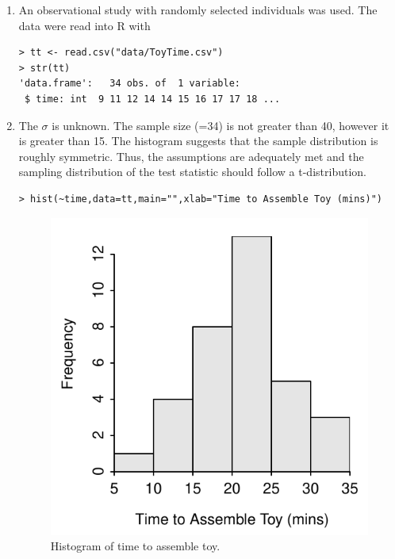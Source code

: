 \documentclass[10pt,openany]{book}\usepackage[]{graphicx}\usepackage[]{color}
\makeatletter
\newenvironment{kframe}{%
 \def\at@end@of@kframe{}%
 \ifinner\ifhmode%
  \def\at@end@of@kframe{\end{minipage}}%
  \begin{minipage}{\columnwidth}%
 \fi\fi%
 \def\FrameCommand##1{\hskip\@totalleftmargin \hskip-\fboxsep
 \colorbox{shadecolor}{##1}\hskip-\fboxsep
     \hskip-\linewidth \hskip-\@totalleftmargin \hskip\columnwidth}%
 \MakeFramed {\advance\hsize-\width
   \@totalleftmargin\z@ \linewidth\hsize
   \@setminipage}}%
 {\par\unskip\endMakeFramed%
 \at@end@of@kframe}
\newenvironment{knitrout}{}{} %
\makeatother
\begin{document}
\begin{itemize}
\begin{enumerate}
      \item An observational study with randomly selected individuals was used.  The data were read into R with
\begin{knitrout}
\color{fgcolor}\begin{kframe}
\begin{verbatim}
> tt <- read.csv("data/ToyTime.csv")
> str(tt)
'data.frame':	34 obs. of  1 variable:
 $ time: int  9 11 12 14 14 15 16 17 17 18 ...
\end{verbatim}
\end{kframe}
\end{knitrout}
      \item The $\sigma$ is unknown.  The sample size (=34) is not greater than 40, however it is greater than 15.  The histogram  suggests that the sample distribution is roughly symmetric.  Thus, the assumptions are adequately met and the sampling distribution of the test statistic should follow a t-distribution.
\begin{knitrout}
\color{fgcolor}\begin{kframe}
\begin{verbatim}
> hist(~time,data=tt,main="",xlab="Time to Assemble Toy (mins)")
\end{verbatim}
\end{kframe}\begin{figure}[hbtp]

{\centering \includegraphics[width=.4\linewidth]{Figs/ToyTimeHist-1} 

}

\caption[Histogram of time to assemble toy]{Histogram of time to assemble toy.}\label{fig:ToyTimeHist}
\end{figure}



\end{knitrout}
\end{enumerate}
\end{itemize}
\end{document}
